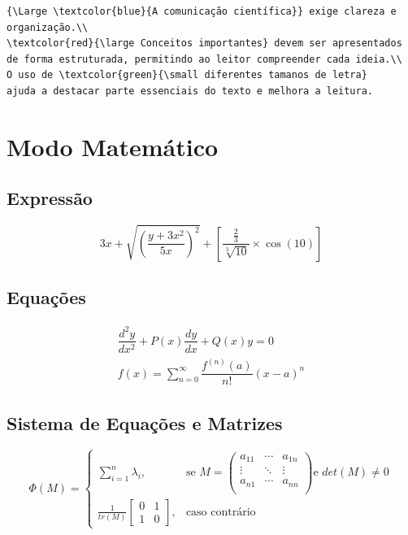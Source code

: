 \documentclass[11pt,a4paper]{report}
\begin{document}
\begin{verbatim}
{\Large \textcolor{blue}{A comunicação científica}} exige clareza e
organização.\\
\textcolor{red}{\large Conceitos importantes} devem ser apresentados
de forma estruturada, permitindo ao leitor compreender cada ideia.\\
O uso de \textcolor{green}{\small diferentes tamanos de letra}
ajuda a destacar parte essenciais do texto e melhora a leitura.
\end{verbatim}

\chapter{Modo Matemático}

\section{Expressão}
$$ 3x + \sqrt{\left(\dfrac{y+3x^2}{5x}\right)^2} + \left[ \dfrac{\frac{2}{3}}{\sqrt[3]{10}} \times \cos(10) \right] $$

\section{Equações}
\begin{gather}
\dfrac{d^2 y}{dx^2} + P(x) \dfrac{dy}{dx} + Q(x)y = 0 \\
f(x) = \sum_{n=0}^{\infty}\dfrac{f^{(n)}(a)}{n!}(x-a)^n
\end{gather}

\section{Sistema de Equações e Matrizes}
$$\Phi(M) =
\begin{cases}

\sum_{i=1}^{n} \lambda_i, & \text{se } M =
\begin{pmatrix}
a_{11} & \cdots & a_{1n} \\
\vdots & \ddots & \vdots \\
a_{n1} & \cdots & a_{nn} \\
\end{pmatrix} \text{e } det(M) \neq 0 \\

\frac{1}{tr(M)}
\begin{bmatrix}
0 & 1\\
1 & 0
\end{bmatrix}, & \text{caso contrário}
\end{cases}
$$
\end{document}

